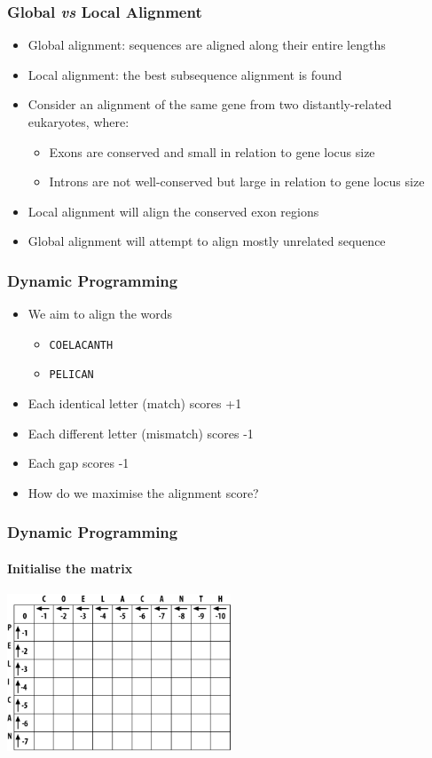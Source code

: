 \documentclass[table]{beamer}
\begin{document}
    \begin{frame}
     \frametitle{Global \textit{vs} Local Alignment}
     \begin{itemize}
       \item<1-> Global alignment: sequences are aligned along their entire lengths
       \item<1-> Local alignment: the best subsequence alignment is found
       \item<2-> Consider an alignment of the same gene from two distantly-related eukaryotes, where:
         \begin{itemize}
           \item<2-> Exons are conserved and small in relation to gene locus size
           \item<2-> Introns are not well-conserved but large in relation to gene locus size
         \end{itemize}
       \item<3-> Local alignment will align the conserved exon regions
       \item<3-> Global alignment will attempt to align mostly unrelated sequence
     \end{itemize}
    \end{frame}

    \begin{frame}
     \frametitle{Dynamic Programming}
     \begin{itemize}
       \item<1-> We aim to align the words
       \begin{itemize}
         \item<1-> \texttt{COELACANTH}
         \item<1-> \texttt{PELICAN}
       \end{itemize}
       \item<2-> Each identical letter (match) scores +1
       \item<2-> Each different letter (mismatch) scores -1
       \item<2-> Each gap scores -1
       \item<3-> How do we maximise the alignment score?
     \end{itemize}
    \end{frame}   
   
    \begin{frame}
     \frametitle{Dynamic Programming}
     \framesubtitle{Initialise the matrix}
       \begin{center}
         \includegraphics[width=0.5\textwidth]{images/initialise}
       \end{center}
    \end{frame}   
   
\end{document}
